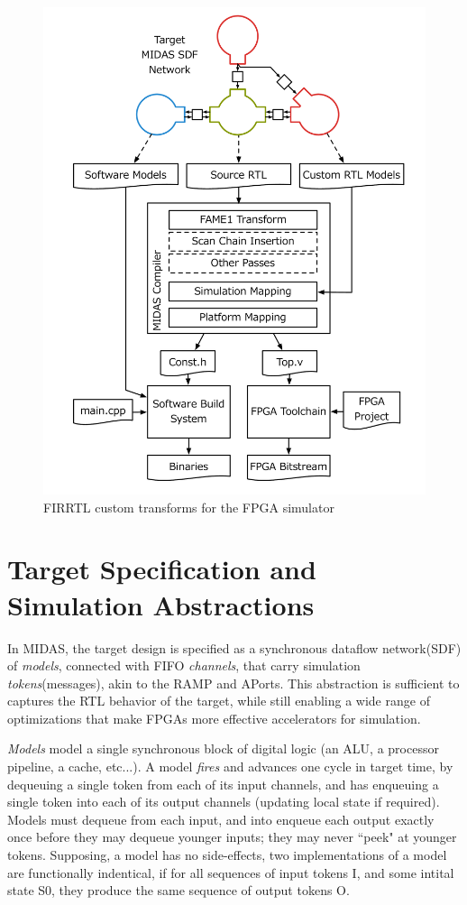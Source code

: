 \begin{figure}
	\centering
	\includegraphics[width=16cm]{figures/toolchain.pdf}
	\caption{FIRRTL custom transforms for the FPGA simulator}
	\label{fig:firrtl}
\end{figure}

\section{Target Specification and Simulation Abstractions}

In MIDAS, the target design is specified as a synchronous dataflow network(SDF)
of \emph{models}, connected with FIFO \emph{channels}, that carry simulation
\emph{tokens}(messages), akin to the RAMP\cite{ramp} and APorts\cite{model}.
This abstraction is sufficient to captures the RTL behavior of the target,
while still enabling a wide range of optimizations that make FPGAs more
effective accelerators for simulation.

\emph{Models} model a single synchronous block of digital logic (an ALU, a
processor pipeline, a cache, etc...). A model \emph{fires} and advances one
cycle in target time, by dequeuing a single token from each of its input
channels, and has enqueuing a single token into each of its output channels
(updating local state if required).  Models must dequeue from each input, and
into enqueue each output exactly once before they may dequeue younger inputs;
they may never ``peek" at younger tokens.  Supposing, a model has no
side-effects, two implementations of a model are functionally indentical, if
for all sequences of input tokens I, and some intital state S0, they produce the
same sequence of output tokens O.

